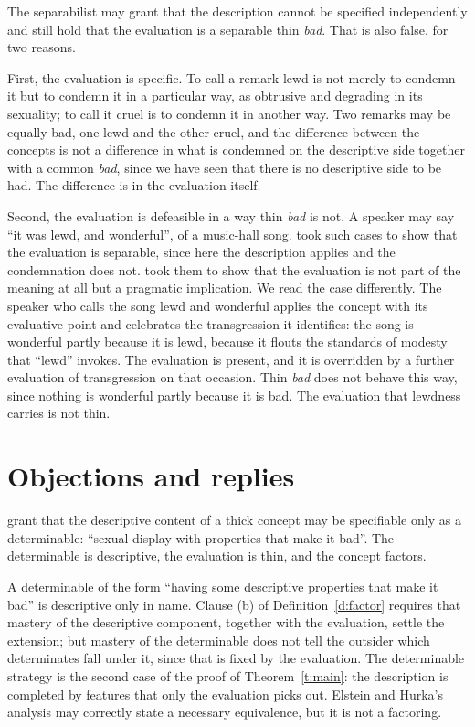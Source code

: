 \documentclass{situationist-preprint}
\begin{document}
The separabilist may grant that the description cannot be specified independently and still hold that the evaluation is a separable thin \emph{bad}. That is also false, for two reasons.

First, the evaluation is specific. To call a remark lewd is not merely to condemn it but to condemn it in a particular way, as obtrusive and degrading in its sexuality; to call it cruel is to condemn it in another way. Two remarks may be equally bad, one lewd and the other cruel, and the difference between the concepts is not a difference in what is condemned on the descriptive side together with a common \emph{bad}, since we have seen that there is no descriptive side to be had. The difference is in the evaluation itself.

Second, the evaluation is defeasible in a way thin \emph{bad} is not. A speaker may say \enquote{it was lewd, and wonderful}, of a music-hall song. \citet{Blackburn1992} took such cases to show that the evaluation is separable, since here the description applies and the condemnation does not. \citet{Vayrynen2013} took them to show that the evaluation is not part of the meaning at all but a pragmatic implication. We read the case differently. The speaker who calls the song lewd and wonderful applies the concept with its evaluative point and celebrates the transgression it identifies: the song is wonderful partly because it is lewd, because it flouts the standards of modesty that \enquote{lewd} invokes. The evaluation is present, and it is overridden by a further evaluation of transgression on that occasion. Thin \emph{bad} does not behave this way, since nothing is wonderful partly because it is bad. The evaluation that lewdness carries is not thin.

\section{Objections and replies}

\begin{objection}
\citet{ElsteinHurka2009} grant that the descriptive content of a thick concept may be specifiable only as a determinable: \enquote{sexual display with properties that make it bad}. The determinable is descriptive, the evaluation is thin, and the concept factors.
\end{objection}

\begin{reply}
A determinable of the form \enquote{having some descriptive properties that make it bad} is descriptive only in name. Clause (b) of Definition~\ref{d:factor} requires that mastery of the descriptive component, together with the evaluation, settle the extension; but mastery of the determinable does not tell the outsider which determinates fall under it, since that is fixed by the evaluation. The determinable strategy is the second case of the proof of Theorem~\ref{t:main}: the description is completed by features that only the evaluation picks out. Elstein and Hurka's analysis may correctly state a necessary equivalence, but it is not a factoring.
\end{reply}
\end{document}
